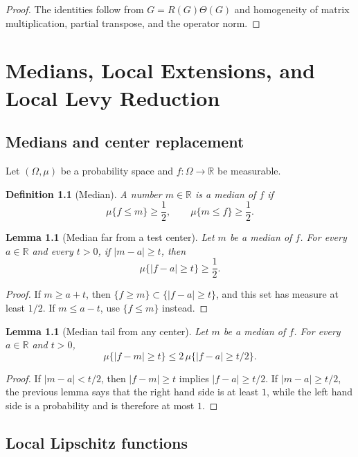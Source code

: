 \documentclass[11pt,oneside]{book}
\newtheorem{lemma}[theorem]{Lemma}
\newtheorem{definition}[theorem]{Definition}
\newcommand{\R}{\mathbb R}
\newcommand{\1}{\mathbf 1}
\begin{document}
\begin{proof}
The identities follow from \(G=R(G)\Theta(G)\) and homogeneity of matrix
multiplication, partial transpose, and the operator norm.
\end{proof}

\chapter{Medians, Local Extensions, and Local Levy Reduction}

\section{Medians and center replacement}

Let \((\Omega,\mu)\) be a probability space and \(f:\Omega\to\R\) be
measurable.

\begin{definition}[Median]
A number \(m\in\R\) is a median of \(f\) if
\[
  \mu\{f\le m\}\ge \frac12,\qquad
  \mu\{m\le f\}\ge \frac12.
\]
\end{definition}

\begin{lemma}[Median far from a test center]
Let \(m\) be a median of \(f\).  For every \(a\in\R\) and every \(t>0\), if
\(|m-a|\ge t\), then
\[
  \mu\{|f-a|\ge t\}\ge \frac12.
\]
\end{lemma}

\begin{proof}
If \(m\ge a+t\), then \(\{f\ge m\}\subset\{|f-a|\ge t\}\), and this set has
measure at least \(1/2\).  If \(m\le a-t\), use \(\{f\le m\}\) instead.
\end{proof}

\begin{lemma}[Median tail from any center]
Let \(m\) be a median of \(f\).  For every \(a\in\R\) and \(t>0\),
\[
  \mu\{|f-m|\ge t\}\le 2\,\mu\{|f-a|\ge t/2\}.
\]
\end{lemma}

\begin{proof}
If \(|m-a|<t/2\), then \(|f-m|\ge t\) implies \(|f-a|\ge t/2\).  If
\(|m-a|\ge t/2\), the previous lemma says that the right hand side is at
least \(1\), while the left hand side is a probability and is therefore at
most \(1\).
\end{proof}

\section{Local Lipschitz functions}
\end{document}
